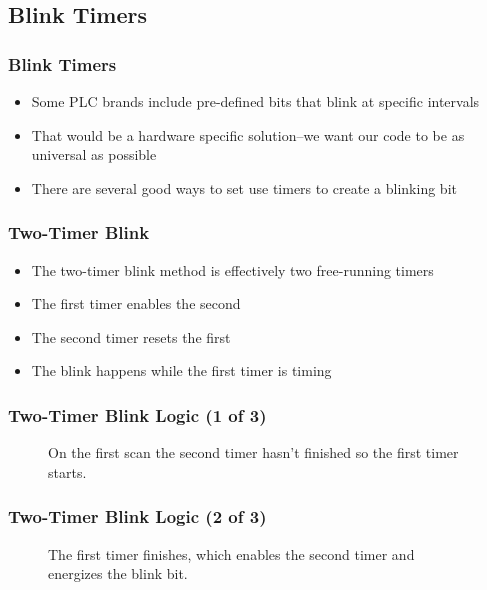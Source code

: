 \subsection{Blink Timers}

\begin{frame}
    \frametitle{Blink Timers}

    \begin{itemize}
        \item Some PLC brands include pre-defined bits that blink at specific intervals
        \item That would be a hardware specific solution--we want our code to be as universal as possible
        \item There are several good ways to set use timers to create a blinking bit
    \end{itemize}
\end{frame}

\begin{frame}
    \frametitle{Two-Timer Blink}

    \begin{itemize}
        \item The two-timer blink method is effectively two free-running timers
        \item The first timer enables the second
        \item The second timer resets the first
        \item The blink happens while the first timer is timing
    \end{itemize}
\end{frame}

\begin{frame}
    \frametitle{Two-Timer Blink Logic (1 of 3)}

    \begin{figure}
        \centering
        \resizebox{0.5\linewidth}{!}{
            
        }

        \vspace{0.5em} 
        {\footnotesize On the first scan the second timer hasn't finished so the first timer starts.\par}
    \end{figure}
\end{frame}

\begin{frame}
    \frametitle{Two-Timer Blink Logic (2 of 3)}

    \begin{figure}
        \centering
        \resizebox{0.5\linewidth}{!}{
            
        }
        
        \vspace{0.5em}
        {\footnotesize The first timer finishes, which enables the second timer and energizes the blink bit.\par}
    \end{figure}
\end{frame}

